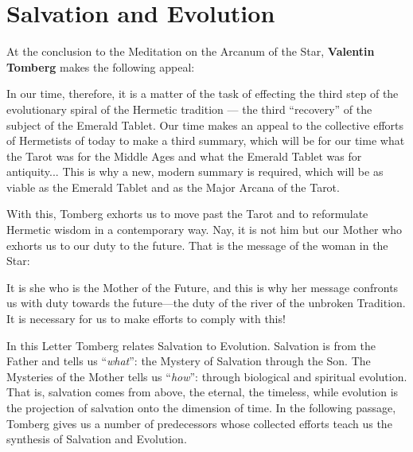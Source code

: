\section{Salvation and Evolution}

At the conclusion to the Meditation on the Arcanum of the Star, \textbf{Valentin Tomberg} makes the following appeal:


\begin{quotex}
In our time, therefore, it is a matter of the task of effecting the third step of the evolutionary spiral of the Hermetic tradition --- the third ``recovery'' of the subject of the Emerald Tablet. Our time makes an appeal to the collective efforts of Hermetists of today to make a third summary, which will be for our time what the Tarot was for the Middle Ages and what the Emerald Tablet was for antiquity... This is why a new, modern summary is required, which will be as viable as the Emerald Tablet and as the Major Arcana of the Tarot.
\end{quotex}


With this, Tomberg exhorts us to move past the Tarot and to reformulate Hermetic wisdom in a contemporary way. Nay, it is not him but our Mother who exhorts us to our duty to the future. That is the message of the woman in the Star:

\begin{quotex}
It is she who is the Mother of the Future, and this is why her message confronts us with duty towards the future---the duty of the river of the unbroken Tradition. It is necessary for us to make efforts to comply with this!
\end{quotex}


In this Letter Tomberg relates Salvation to Evolution. Salvation is from the Father and tells us ``\emph{what}'': the Mystery of Salvation through the Son. The Mysteries of the Mother tells us ``\emph{how}'': through biological and spiritual evolution. That is, salvation comes from above, the eternal, the timeless, while evolution is the projection of salvation onto the dimension of time. In the following passage, Tomberg gives us a number of predecessors whose collected efforts teach us the synthesis of Salvation and Evolution.

